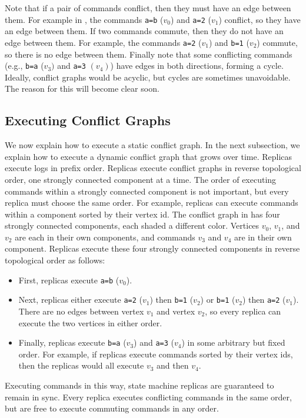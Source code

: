 {}

Note that if a pair of commands conflict, then they must have an edge between
them. For example in , the commands \texttt{a=b} ($v_0$)
and \texttt{a=2} ($v_1$) conflict, so they have an edge between them. If two
commands commute, then they do not have an edge between them. For
example, the commands \texttt{a=2} ($v_1$) and \texttt{b=1} ($v_2$) commute, so
there is no edge between them. Finally note that some conflicting commands
(e.g., \texttt{b=a} ($v_3)$ and \texttt{a=3} $(v_4)$) have edges in both
directions, forming a cycle. Ideally, conflict graphs would be acyclic, but
cycles are sometimes unavoidable. The reason for this will become clear soon.

\subsection{Executing Conflict Graphs}
We now explain how to execute a static conflict graph. In the next subsection,
we explain how to execute a dynamic conflict graph that grows over time.
%
Replicas execute logs in prefix order. Replicas execute conflict graphs in
reverse topological order, one strongly connected component at a time.  The
order of executing commands within a strongly connected component is not
important, but every replica must choose the same order. For example, replicas
can execute commands within a component sorted by their vertex id.
%
The conflict graph in  has four strongly connected
components, each shaded a different color. Vertices $v_0$, $v_1$, and $v_2$ are
each in their own components, and commands $v_3$ and $v_4$ are in their own
component. Replicas execute these four strongly connected components in reverse
topological order as follows:
\begin{itemize}
  \item
    First, replicas execute \texttt{a=b} ($v_0$).

  \item
    Next, replicas either execute \texttt{a=2} ($v_1$) then \texttt{b=1}
    ($v_2$) or \texttt{b=1} ($v_2$) then \texttt{a=2} ($v_1$). There are no
    edges between vertex $v_1$ and vertex $v_2$, so every replica can execute
    the two vertices in either order.

  \item
    Finally, replicas execute \texttt{b=a} ($v_3$) and \texttt{a=3} ($v_4$) in
    some arbitrary but fixed order. For example, if replicas execute commands
    sorted by their vertex ids, then the replicas would all execute $v_3$ and
    then $v_4$.
\end{itemize}
Executing commands in this way, state machine replicas are guaranteed to remain
in sync. Every replica executes conflicting commands in the same order, but are
free to execute commuting commands in any order.

